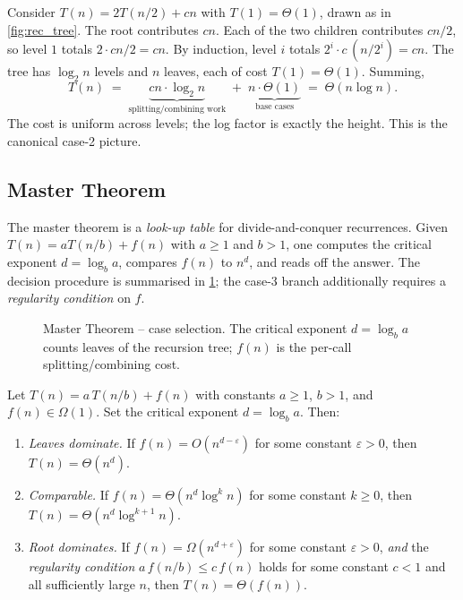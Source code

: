 \begin{example}[Recursion tree for $T(n) = 2T(n/2) + cn$]
\label{ex:rec_tree_mergesort}
Consider $T(n) = 2T(n/2) + cn$ with $T(1) = \Theta(1)$, drawn as in \cref{fig:rec_tree}. The root contributes $cn$. Each of the two children contributes $cn/2$, so level $1$ totals $2 \cdot cn/2 = cn$. By induction, level $i$ totals $2^i \cdot c\,(n/2^i) = cn$. The tree has $\log_2 n$ levels and $n$ leaves, each of cost $T(1) = \Theta(1)$. Summing,
\[
  T(n) \;=\; \underbrace{cn \cdot \log_2 n}_{\text{splitting/combining work}} \;+\; \underbrace{n \cdot \Theta(1)}_{\text{base cases}}
  \;=\; \Theta(n \log n).
\]
The cost is uniform across levels; the log factor is exactly the height. This is the canonical case-2 picture.
\end{example}

\subsection{Master Theorem}

The master theorem is a \emph{look-up table} for divide-and-conquer recurrences. Given $T(n) = a T(n/b) + f(n)$ with $a \ge 1$ and $b > 1$, one computes the critical exponent $d = \log_b a$, compares $f(n)$ to $n^d$, and reads off the answer. The decision procedure is summarised in \cref{fig:mt_cases}; the case-3 branch additionally requires a \emph{regularity condition} on $f$.

\begin{figure}[h]
  \centering
  
  \caption{Master Theorem -- case selection. The critical exponent $d = \log_b a$ counts leaves of the recursion tree; $f(n)$ is the per-call splitting/combining cost.}
  \label{fig:mt_cases}
\end{figure}

\begin{theorem}
\label{thm:master}
Let $T(n) = a\,T(n/b) + f(n)$ with constants $a \ge 1$, $b > 1$, and $f(n) \in \Omega(1)$. Set the critical exponent $d = \log_b a$. Then:
\begin{enumerate}[(1)]
  \item \emph{Leaves dominate.} If $f(n) = O(n^{d - \varepsilon})$ for some constant $\varepsilon > 0$, then $T(n) = \Theta(n^d)$.
  \item \emph{Comparable.} If $f(n) = \Theta(n^d \log^k n)$ for some constant $k \ge 0$, then $T(n) = \Theta(n^d \log^{k+1} n)$.
  \item \emph{Root dominates.} If $f(n) = \Omega(n^{d + \varepsilon})$ for some constant $\varepsilon > 0$, \emph{and} the \emph{regularity condition} $a\,f(n/b) \le c\,f(n)$ holds for some constant $c < 1$ and all sufficiently large $n$, then $T(n) = \Theta(f(n))$.
\end{enumerate}
\end{theorem}

